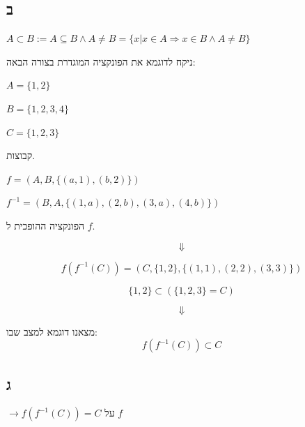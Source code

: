 \documentclass{article}
\begin{document}
\subsection*{ב}

\begin{define}
    $ A \subset B := A \subseteq B \land A \not = B = \{ x | x \in A \Rightarrow x \in B \land A \not = B \} $
\end{define}

ניקח לדוגמא את הפונקציה המוגדרת בצורה הבאה:

\begin{ex}
    \begin{letyehi}
        $ A = \{ 1, 2 \} $
    \end{letyehi}
    
    \begin{letyehi}
        $ B = \{ 1, 2, 3, 4 \} $
    \end{letyehi}
    
    \begin{letyehi}
        $ C = \{ 1, 2, 3 \} $
    \end{letyehi}
    קבוצות.

    \begin{letyehi}
        $ f = (A, B, \{ (a, 1), (b, 2) \}) $
    \end{letyehi}
   
    \begin{letyehi}
        $ f^{-1} = (B, A, \{ (1, a), (2, b), (3, a), (4, b) \}) $
    \end{letyehi}
    הפונקציה ההופכית ל $f$.

    \[ \Downarrow \]

    \[
        f(f^{-1}(C)) = (C, \{ 1, 2 \}, \{ (1, 1), (2, 2), (3, 3) \})
    \]

    \[
        \{ 1, 2 \} \subset (\{ 1, 2, 3 \} = C)
    \]

    \[ \Downarrow \]

    מצאנו דוגמא למצב שבו:
    \[
        f(f^{-1}(C)) \subset C
    \]
\end{ex}

\newpage

\subsection*{ג}

\begin{ntp}
    $ \rightarrow f(f^{-1}(C)) = C $
    על $f$
\end{ntp}
\end{document}
